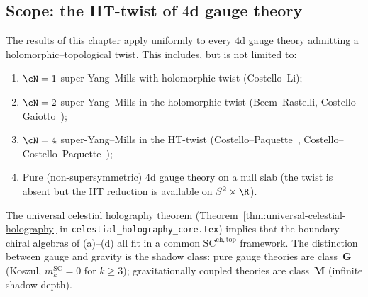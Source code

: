 \subsection{Scope: the HT-twist of $4$d gauge theory}
\label{subsec:ym-ht-scope}

The results of this chapter apply uniformly to every $4$d gauge theory
admitting a holomorphic--topological twist. This includes, but is not
limited to:
\begin{enumerate}[label=\textup{(\alph*)}]
\item $\cN=1$ super-Yang--Mills with holomorphic twist (Costello--Li);
\item $\cN=2$ super-Yang--Mills in the holomorphic twist
(Beem--Rastelli, Costello--Gaiotto~\cite{CostelloGaiottoBoundaryVOA});
\item $\cN=4$ super-Yang--Mills in the HT-twist
(Costello--Paquette~\cite{CostelloPaquetteTwistedSugraStates},
Costello--Costello--Paquette~\cite{CostelloLiSugraTwist});
\item Pure (non-supersymmetric) $4$d gauge theory on a null slab
(the twist is absent but the HT reduction is available on
$S^2\times \R$).
\end{enumerate}
The universal celestial holography theorem
(Theorem~\ref{thm:universal-celestial-holography} in
\texttt{celestial\_holography\_core.tex}) implies that the boundary
chiral algebras of (a)--(d) all fit in a common
$\mathrm{SC}^{\mathrm{ch,top}}$ framework. The distinction between
gauge and gravity is the shadow class: pure gauge theories are
class~$\mathbf G$ (Koszul, $m_k^{\mathrm{SC}} = 0$ for $k\geq 3$);
gravitationally coupled theories are class~$\mathbf M$ (infinite
shadow depth).

